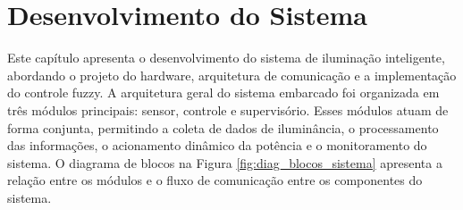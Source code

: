 
\chapter{Desenvolvimento do Sistema}

Este capítulo apresenta o desenvolvimento do sistema de iluminação inteligente, abordando o projeto do hardware, arquitetura de comunicação e a implementação do controle fuzzy. A arquitetura geral do sistema embarcado foi organizada em três módulos principais: sensor, controle e supervisório. Esses módulos atuam de forma conjunta, permitindo a coleta de dados de iluminância, o processamento das informações, o acionamento dinâmico da potência e o monitoramento do sistema. O diagrama de blocos na Figura \ref{fig:diag_blocos_sistema} apresenta a relação entre os módulos e o fluxo de comunicação entre os componentes do sistema.


